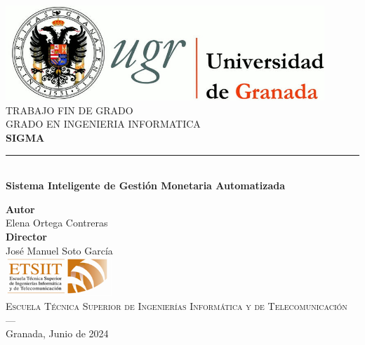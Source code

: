 \begin{titlepage}
    \newlength{\centeroffset}
    \setlength{\centeroffset}{-0.5\oddsidemargin}
    \addtolength{\centeroffset}{0.5\evensidemargin}
    \thispagestyle{empty}
    
    \noindent\hspace*{\centeroffset}\begin{minipage}{\textwidth}
    
    \centering
    \includegraphics[width=0.9\textwidth]{logos/logo_ugr.jpg}\\[1.4cm]
    
    \textsc{ \Large TRABAJO FIN DE GRADO\\[0.2cm]}
    \textsc{ GRADO EN INGENIERIA INFORMATICA}\\[1cm]
    
    {\Huge\bfseries SIGMA \\}
    \noindent\rule[-1ex]{\textwidth}{3pt}\\[3.5ex]
    {\large\bfseries Sistema Inteligente de Gestión Monetaria Automatizada }
    \end{minipage}
    
    \vspace{2.5cm}
    \noindent\hspace*{\centeroffset}
    \begin{minipage}{\textwidth}
    \centering
    
    \textbf{Autor}\\ {Elena Ortega Contreras}\\[2.5ex]
    \textbf{Director}\\ {José Manuel Soto García}\\[2cm]
    \includegraphics[width=0.3\textwidth]{logos/etsiit_logo.png}\\[0.1cm]
    \textsc{Escuela Técnica Superior de Ingenierías Informática y de Telecomunicación}\\
    \textsc{---}\\
    Granada, Junio de 2024
    \end{minipage}
    \end{titlepage}